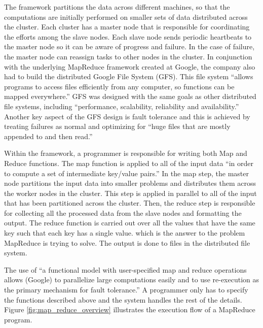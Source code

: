 \documentclass{article}
\begin{document}
The framework partitions the data across different machines, so that the
computations are initially performed on smaller sets of data distributed across the
cluster. Each cluster has a master node that is responsible for coordinating the
efforts among the slave nodes. Each slave node sends periodic heartbeats to the
master node so it can be aware of progress and failure. In the case of failure, the
master node can reassign tasks to other nodes in the cluster. In conjunction with
the underlying MapReduce framework created at Google, the company also had to build
the distributed Google File System (GFS). This file system ``allows programs to
access files efficiently from any computer, so functions can be mapped
everywhere.'' GFS was designed with the same goals as other distributed file
systems, including ``performance, scalability, reliability and availability.''
Another key aspect of the GFS design is fault tolerance and this is achieved by
treating failures as normal and optimizing for ``huge files that are mostly
appended to and then read.''

Within the framework, a programmer is responsible for writing both Map and Reduce
functions. The map function is applied to all of the input data ``in order to
compute a set of intermediate key/value pairs.'' In the map step, the master node
partitions the input data into smaller problems and distributes them across the
worker nodes in the cluster. This step is applied in parallel to all of the input
that has been partitioned across the cluster. Then, the reduce step is responsible
for collecting all the processed data from the slave nodes and formatting the
output. The reduce function is carried out over all the values that have the same
key such that each key has a single value. which is the answer to the problem
MapReduce is trying to solve. The output is done to files in the distributed file
system.

The use of ``a functional model with user-specified map and reduce operations allows (Google) to parallelize large computations
easily and to use re-execution as the primary mechanism for fault tolerance.'' A programmer only has to specify the functions
described above and the system handles the rest of the details. Figure \ref{fig:map_reduce_overview} illustrates the execution
flow of a MapReduce program.
\end{document}
